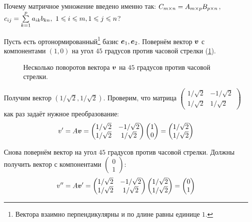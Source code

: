 \documentclass[a4paper,12pt]{article}
\begin{document}
  Почему матричное умножение введено именно так: $C_{m\times n} \hm= A_{m\times p}B_{p\times n}$, $c_{ij} \hm= \sum\limits_{k=1}^p a_{ik} b_{kn},\ 1 \hm\leq i \hm\leq m, 1 \hm\leq j \hm\leq n$?
  
  Пусть есть ортонормированный\footnote{Вектора взаимно перпендикулярны и по длине равны единице $1$.} базис $\boldsymbol e_1, \boldsymbol e_2$.
  Повернём вектор $\boldsymbol v$ с компонентами $(1, 0)$ на угол $45$ градусов против часовой стрелки (\ref{fig:turning-vector}).
  
  \begin{figure}[h]
    \centering
    
    
    \caption{Несколько поворотов вектора $\boldsymbol v$ на $45$ градусов против часовой стрелки.}
    \label{fig:turning-vector}
  \end{figure}
  
  Получим вектор $\left(1/\sqrt{2}, 1/\sqrt{2}\right)$.
  Проверим, что матрица $\left(\begin{smallmatrix}1/\sqrt{2} & -1/\sqrt{2}\\ 1/\sqrt{2} & 1/\sqrt{2}\end{smallmatrix}\right)$ как раз задаёт нужное преобразование:
  \[
    v'
    = A \boldsymbol v
    = \begin{pmatrix}
        1/\sqrt{2} & -1/\sqrt{2}\\
        1/\sqrt{2} & 1/\sqrt{2}
      \end{pmatrix}
      \begin{pmatrix}
        1 \\ 0
      \end{pmatrix}
    = \begin{pmatrix}
        1/\sqrt{2} \\ 1/\sqrt{2}
      \end{pmatrix}
  \]
  
  Снова повернём вектор на угол $45$ градусов против часовой стрелки.
  Должны получить вектор с компонентами $\left(\begin{smallmatrix}0 \\ 1\end{smallmatrix}\right)$:
  \[
    v''
    = A \boldsymbol v'
    = \begin{pmatrix}
        1/\sqrt{2} & -1/\sqrt{2}\\
        1/\sqrt{2} & 1/\sqrt{2}
      \end{pmatrix}
      \begin{pmatrix}
        1/\sqrt{2} \\ 1/\sqrt{2}
      \end{pmatrix}
    = \begin{pmatrix}
        0 \\ 1
      \end{pmatrix}
  \]
  
\end{document}
